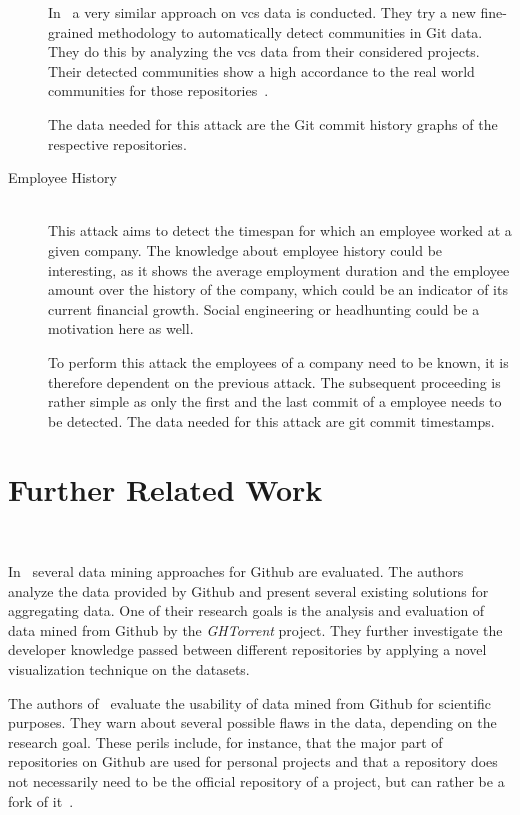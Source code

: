 \begin{description}
        In~\cite{inproceedings:developer-networks} a very similar approach on \ac{vcs} data is conducted.
        They try a new fine-grained methodology to automatically detect communities in Git data.
        They do this by analyzing the \ac{vcs} data from their considered projects.
        Their detected communities show a high accordance to the real world communities for those repositories~\cite[p.~10]{inproceedings:developer-networks}.

        The data needed for this attack are the Git commit history graphs of the respective repositories.

    \item[Employee History] \hfill \\
        This attack aims to detect the timespan for which an employee worked at a given company.
        The knowledge about employee history could be interesting, as it shows the average employment duration and the employee amount over the history of the company, which could be an indicator of its current financial growth.
        Social engineering or headhunting could be a motivation here as well.

        To perform this attack the employees of a company need to be known, it is therefore dependent on the previous attack.
        The subsequent proceeding is rather simple as only the first and the last commit of a employee needs to be detected.
        The data needed for this attack are git commit timestamps.

\end{description}


\section{Further Related Work}~\label{further-related-work}

In~\cite{git-mining} several data mining approaches for Github are evaluated.
The authors analyze the data provided by Github and present several existing solutions for aggregating data.
One of their research goals is the analysis and evaluation of data mined from Github by the \emph{GHTorrent} project.
They further investigate the developer knowledge passed between different repositories by applying a novel visualization technique on the datasets.

The authors of~\cite{inproceedings:promises-and-perils} evaluate the usability of data mined from Github for scientific purposes.
They warn about several possible flaws in the data, depending on the research goal.
These perils include, for instance, that the major part of repositories on Github are used for personal projects and that a repository does not necessarily need to be the official repository of a project, but can rather be a fork of it~\cite[p.~4]{inproceedings:promises-and-perils}.
